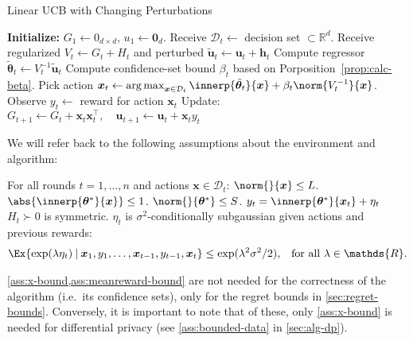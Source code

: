 \documentclass{article}
\renewcommand{\vec}[1]{\bm{#1}}
\newcommand{\inv}[1]{#1^{-1}}
\newcommand{\Real}{\mathds{R}}
\newcommand{\argmax}{\operatorname*{arg\,max}}
\newcommand\given[1][\delimsize]{%
  \providecommand{\delimsize}{}
  \nonscript\:#1\vert\allowbreak\nonscript\:\mathopen{}
}
\DeclarePairedDelimiter{\abs}||
\newcommand{\D}{\mathcal{D}}
\providecommand\transp{\top}
\let\transpsymbol\transp
\renewcommand{\transp}[1]{#1^\transpsymbol}
\newenvironment{assumptions*}[2][]{%
  \begin{assumptions}[#1]
    #2
    \begin{enumerate}[nolistsep]
      \setcounter{enumi}{\theassumption}
      \newcommand{\assume}[1][]{\item\label[assumption]{##1}}
    }{
      \setcounter{assumption}{\theenumi}
    \end{enumerate}
  \end{assumptions}%
}
\begin{document}
\begin{algorithm}
  \caption{Linear UCB with Changing Perturbations}\label{alg:linucb}
  \begin{algorithmic}
    \State \textbf{Initialize:} $G_1 \gets 0_{d\times d}$,
    $u_1\gets \vec 0_{d}$.
    \State Receive $\D_t \gets{}$ decision set ${} \subset \Real^d$.
    \State Receive regularized $V_t \gets G_t + H_t$ and perturbed $\tilde{\vec u}_t \gets \vec u_t + \vec h_t$
    \State Compute regressor $\tilde{\vec\theta}_{t} \gets \inv{V_{t}}\tilde{\vec u}_{t}$
    \State Compute confidence-set bound $\beta_t$ based on Porposition~\ref{prop:calc-beta}.
    \State Pick action $\vec x_t \gets \argmax_{\vec x\in\D_t}
    \innerp{\tilde{\vec \theta}_t}{\vec x} +
    \beta_t\norm{\inv{V_t}}{\vec x}$.
    \State Observe $y_t \gets {}$ reward for action $\vec x_t$
    \State Update: $G_{t+1} \gets G_{t} + \vec x_t \transp{\vec x_t},
    \quad \vec u_{t+1} \gets \vec u_{t} + \vec x_t y_t$
    \EndFor
  \end{algorithmic}
\end{algorithm}

We will refer back to the following assumptions about the environment
and algorithm:
\begin{assumptions*}{%
    For all rounds $t=1,\dotsc,n$ and actions $\vec x\in\D_t$:}
   $\norm{}{\vec x} \le L$.
  $\abs{\innerp{\vec\theta^*}{\vec x}} \le 1$.
   $\norm{}{\vec\theta^*} \le S$.
  $y_t = \innerp{\vec\theta^*}{\vec x_t} + \eta_t$
   $H_t \succ 0$ is symmetric.
   $\eta_t$ is $\sigma^2$-conditionally
  subgaussian given actions and previous rewards:
  \begin{align*}
    \Ex{\exp(\lambda\eta_t) \given \vec x_1, y_1, \dotsc, \vec x_{t-1}, y_{t-1}, \vec x_t}
    &\le \exp(\lambda^2\sigma^2/2), &\text{for all } \lambda\in\Real.
  \end{align*}
\end{assumptions*}
\cref{ass:x-bound,ass:meanreward-bound} are not needed for the
correctness of the algorithm (i.e.\ its confidence sets), only for the
regret bounds in \cref{sec:regret-bounds}.  Conversely, it is
important to note that of these, only \cref{ass:x-bound} is needed for
differential privacy (see \cref{ass:bounded-data} in \cref{sec:alg-dp}).
\end{document}
